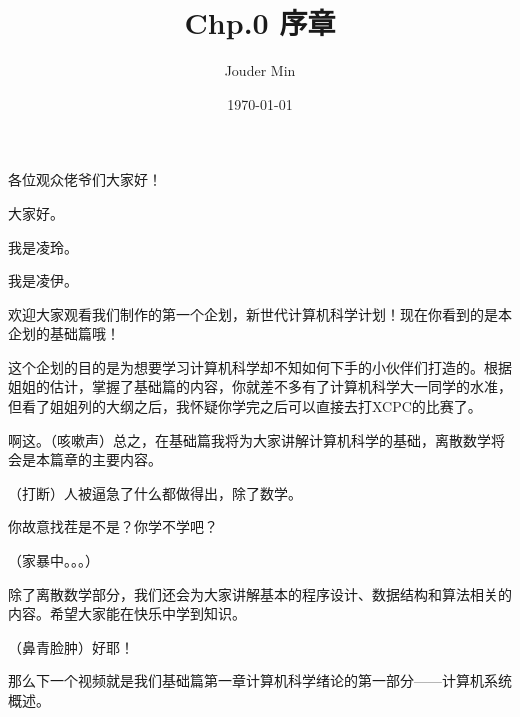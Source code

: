 \documentclass{script}
\title{\textbf{Chp.0 序章}}
\author{Jouder Min}
\date{\today}
\begin{document}
\maketitle
\setlength{\parskip}{1em}
\begin{description}[itemsep=1ex,leftmargin=0.92cm]
    \item[凌玲] 各位观众佬爷们大家好！
    \item[凌伊] 大家好。
    \item[凌玲] 我是凌玲。
    \item[凌伊] 我是凌伊。
    \item[凌玲] 欢迎大家观看我们制作的第一个企划，新世代计算机科学计划！现在你看到的是本企划的基础篇哦！
    \item[凌伊] 这个企划的目的是为想要学习计算机科学却不知如何下手的小伙伴们打造的。根据姐姐的估计，掌握了基础篇的内容，你就差不多有了计算机科学大一同学的水准，但看了姐姐列的大纲之后，我怀疑你学完之后可以直接去打XCPC的比赛了。
    \item[凌玲] 啊这。（{\kaishu 咳嗽声}）总之，在基础篇我将为大家讲解计算机科学的基础，离散数学将会是本篇章的主要内容。
    \item[凌伊] （{\kaishu 打断}）人被逼急了什么都做得出，除了数学。
    \item[凌玲] 你故意找茬是不是？你学不学吧？
    \item[] （{\kaishu 家暴中。。。}）
    \item[凌玲] 除了离散数学部分，我们还会为大家讲解基本的程序设计、数据结构和算法相关的内容。希望大家能在快乐中学到知识。
    \item[凌伊] （{\kaishu 鼻青脸肿}）好耶！
    \item[凌玲] 那么下一个视频就是我们基础篇第一章计算机科学绪论的第一部分——计算机系统概述。
\end{description}
\end{document}

